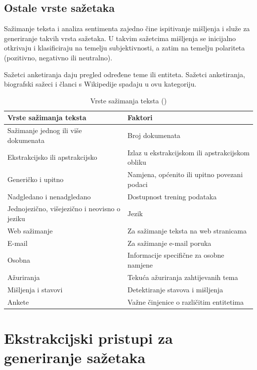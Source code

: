 \documentclass[times, utf8, zavrsni, numeric]{fer}
\begin{document}
\subsection{Ostale vrste sažetaka}
Sažimanje teksta i analiza sentimenta zajedno čine ispitivanje mišljenja i služe za generiranje takvih vrsta sažetaka.
U takvim sažetcima mišljenja se inicijalno otkrivaju i klasificiraju na temelju subjektivnosti, a zatim na temelju polariteta (pozitivno, negativno ili neutralno).
\par
Sažetci anketiranja daju pregled određene teme ili entiteta.
Sažetci anketiranja, biografski sažeci i članci s Wikipedije spadaju u ovu kategoriju.

\begin{table}[htb]
\caption{Vrste sažimanja teksta (\citet{article1})}
\label{tbl:vst}
\centering
\begin{tabular}{l|l} \hline
Vrste sažimanja teksta & Faktori \\ \hline
Sažimanje jednog ili više dokumenata & Broj dokumenata \\
Ekstrakcijsko ili apstrakcijsko & Izlaz u ekstrakcijskom ili apstrakcijskom obliku \\
Generičko i upitno & Namjena, općenito ili upitno povezani podaci \\
Nadgledano i nenadgledano & Dostupnost trening podataka \\
Jednojezično, višejezično i neovisno o jeziku & Jezik \\
Web sažimanje & Za sažimanje teksta na web stranicama \\
E-mail & Za sažimanje e-mail poruka \\
Osobna & Informacije specifične za osobne namjene \\
Ažuriranja & Tekuća ažuriranja zahtijevanih tema \\
Mišljenja i stavovi & Detektiranje stavova i mišljenja \\
Ankete & Važne činjenice o različitim entitetima\\ \hline
\end{tabular}
\end{table}

\section{Ekstrakcijski pristupi za generiranje sažetaka}
\end{document}
